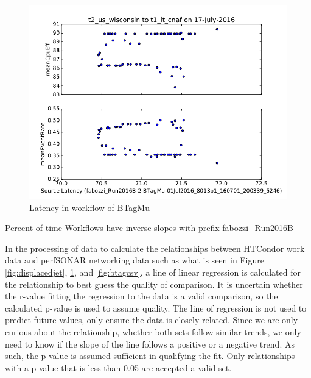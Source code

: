 \documentclass[sigconf]{acmart}
\begin{document}
\begin{figure}[!htb]
		\includegraphics[width=\linewidth]{btagmu_us_cnaf}
		\caption{Latency in workflow of BTagMu}
		\label{fig:btagmu}
	\endminipage\hfill
\end{figure}
\begin{table}
	\caption{Percent of time Workflows have inverse slopes with prefix fabozzi\_Run2016B}
	\label{tab:workflows}
\end{table}
In the processing of data to calculate the relationships between HTCondor work data and perfSONAR networking data such as what is seen in Figure \ref{fig:displacedjet}, \ref{fig:btagmu}, and \ref{fig:btagcsv}, a line of linear regression is calculated for the relationship to best guess the quality of comparison. It is uncertain whether the r-value fitting the regression to the data is a valid comparison, so the calculated p-value is used to assume quality. The line of regression is not used to predict future values, only ensure the data is closely related. Since we are only curious about the relationship, whether both sets follow similar trends, we only need to know if the slope of the line follows a positive or a negative trend. As such, the p-value is assumed sufficient in qualifying the fit. Only relationships with a p-value that is less than 0.05 are accepted a valid set.
\end{document}
